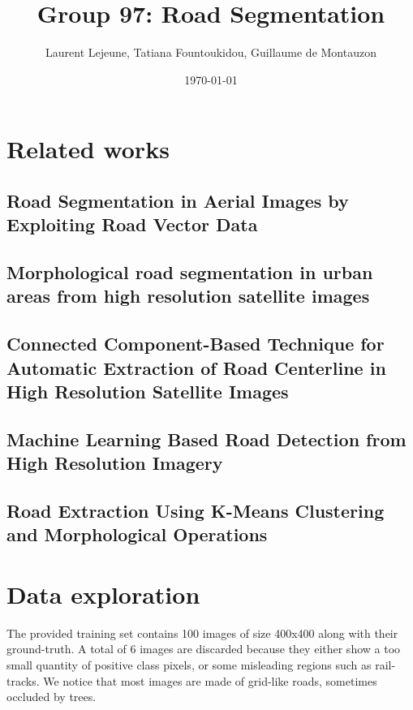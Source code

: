 \documentclass[10pt,conference,compsocconf]{IEEEtran}
\author{Laurent Lejeune, Tatiana Fountoukidou, Guillaume de Montauzon}
\date{\today}
\title{Group 97: Road Segmentation}
\begin{document}
\maketitle


\section{Related works}
\label{sec:orgheadline6}
\subsection{Road Segmentation in Aerial Images by Exploiting Road Vector Data \cite{6602035}}
\label{sec:orgheadline1}
\subsection{Morphological road segmentation in urban areas from high resolution satellite images \cite{gaetano:inria-00618222}}
\label{sec:orgheadline2}
\subsection{Connected Component-Based Technique for Automatic Extraction of Road Centerline in High Resolution Satellite Images \cite{sujatha15_connec_compon_based_techn_autom}}
\label{sec:orgheadline3}
\subsection{Machine Learning Based Road Detection from High Resolution Imagery}
\label{sec:orgheadline4}
\subsection{Road Extraction Using K-Means Clustering and Morphological Operations \cite{maurya2011road}}
\label{sec:orgheadline5}

\section{Data exploration}
\label{sec:orgheadline7}
The provided training set contains 100 images of size 400x400 along with their ground-truth. A total of 6 images are discarded because they either show a too small quantity of positive class pixels, or some misleading regions such as rail-tracks. 
We notice that most images are made of grid-like roads, sometimes occluded by trees. 
\end{document}
